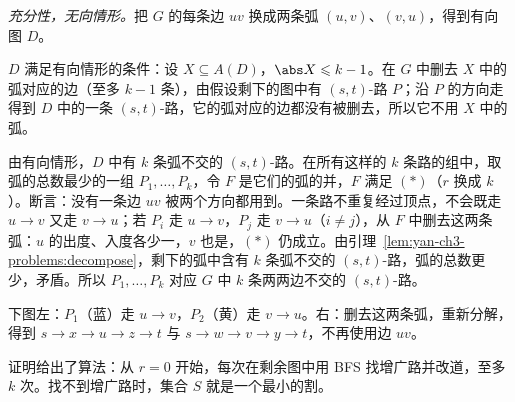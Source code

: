 \begin{solution}
\emph{充分性，无向情形。}把 $G$ 的每条边 $uv$ 换成两条弧 $(u,v)$、$(v,u)$，得到有向图 $D$。

$D$ 满足有向情形的条件：设 $X\subseteq A(D)$，$\abs X\leqslant k-1$。在 $G$ 中删去 $X$ 中的弧对应的边（至多 $k-1$ 条），由假设剩下的图中有 $(s,t)$-路 $P$；沿 $P$ 的方向走得到 $D$ 中的一条 $(s,t)$-路，它的弧对应的边都没有被删去，所以它不用 $X$ 中的弧。

由有向情形，$D$ 中有 $k$ 条弧不交的 $(s,t)$-路。在所有这样的 $k$ 条路的组中，取弧的总数最少的一组 $P_1,\dots,P_k$，令 $F$ 是它们的弧的并，$F$ 满足 $(*)$（$r$ 换成 $k$）。断言：没有一条边 $uv$ 被两个方向都用到。一条路不重复经过顶点，不会既走 $u\to v$ 又走 $v\to u$；若 $P_i$ 走 $u\to v$，$P_j$ 走 $v\to u$（$i\neq j$），从 $F$ 中删去这两条弧：$u$ 的出度、入度各少一，$v$ 也是，$(*)$ 仍成立。由引理~\ref{lem:yan-ch3-problems:decompose}，剩下的弧中含有 $k$ 条弧不交的 $(s,t)$-路，弧的总数更少，矛盾。所以 $P_1,\dots,P_k$ 对应 $G$ 中 $k$ 条两两边不交的 $(s,t)$-路。

下图左：$P_1$（蓝）走 $u\to v$，$P_2$（黄）走 $v\to u$。右：删去这两条弧，重新分解，得到 $s\to x\to u\to z\to t$ 与 $s\to w\to v\to y\to t$，不再使用边 $uv$。
\begin{center}
\end{center}
\end{solution}
\begin{remark}
证明给出了算法：从 $r=0$ 开始，每次在剩余图中用 BFS 找增广路并改道，至多 $k$ 次。找不到增广路时，集合 $S$ 就是一个最小的割。
\end{remark}

